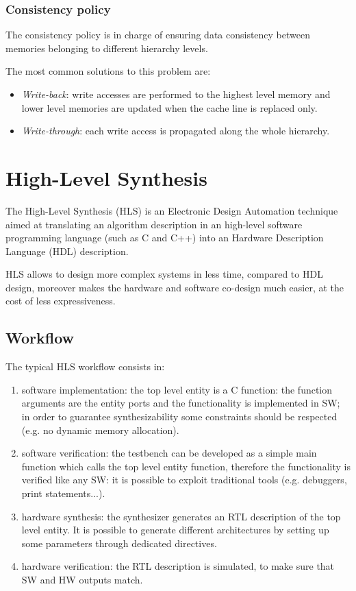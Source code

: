 \documentclass[11pt,a4paper]{memoir}
\begin{document}
\subsubsection{Consistency policy}
The consistency policy is in charge of ensuring data consistency between memories
belonging to different hierarchy levels.

The most common solutions to this problem are:
\begin{itemize}
	\item \emph{Write-back}: write accesses are performed to the highest
		level memory and lower level memories are updated when the cache
		line is replaced only.
	\item \emph{Write-through}: each write access is propagated along the
		whole hierarchy.
\end{itemize}

\section{High-Level Synthesis}
The High-Level Synthesis (HLS) is an Electronic Design Automation technique
aimed at translating an algorithm description in an high-level software
programming language (such as C and C++) into an Hardware Description Language
(HDL) description.

HLS allows to design more complex systems in less time, compared to HDL design,
moreover makes the hardware and software co-design much easier, at the cost of
less expressiveness.

\subsection{Workflow}
The typical HLS workflow consists in:
\begin{enumerate}
	\item software implementation: the top level entity is a C function:
		the function arguments are the entity ports and the functionality
		is implemented in SW; in order to guarantee synthesizability
		some constraints should be respected (e.g. no dynamic memory
		allocation).
	\item software verification: the testbench can be developed as a simple
		main function which calls the top level entity function,
		therefore the functionality is verified like any SW:
		it is possible to exploit traditional tools (e.g. debuggers,
		print statements...).
	\item hardware synthesis: the synthesizer generates an RTL description
		of the top level entity. It is possible to generate different
		architectures by setting up some parameters through dedicated
		directives.
	\item hardware verification: the RTL description is simulated, to make
		sure that SW and HW outputs match.
\end{enumerate}
\end{document}
